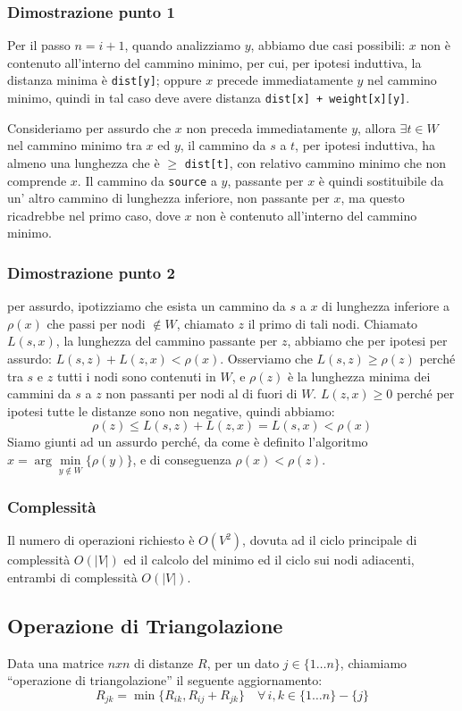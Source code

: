 \documentclass[../template]{subfiles}
\begin{document}
\subsubsection{Dimostrazione punto 1}
Per il passo $n = i+1$, quando analizziamo $y$, abbiamo due casi possibili:
$x$ non è contenuto all'interno del cammino minimo, per cui, per ipotesi induttiva, la distanza minima è \lstinline{dist[y]};
oppure $x$ precede immediatamente $y$ nel cammino minimo, quindi in tal caso deve avere distanza \lstinline{dist[x] + weight[x][y]}.

Consideriamo per assurdo che $x$ non preceda immediatamente $y$, allora $\exists t \in W$ nel cammino minimo tra $x$ ed $y$,
il cammino da $s$ a $t$, per ipotesi induttiva, ha almeno una lunghezza che è $\ge$ \lstinline{dist[t]}, con relativo cammino minimo
che non comprende $x$.
Il cammino da \lstinline{source} a $y$, passante per $x$ è quindi sostituibile da un' altro cammino di lunghezza inferiore, non passante
per $x$, ma questo ricadrebbe nel primo caso, dove $x$ non è contenuto all'interno del cammino minimo.

\subsubsection{Dimostrazione punto 2}
per assurdo, ipotizziamo che esista un cammino da $s$ a $x$ di lunghezza inferiore a $\rho(x)$ che passi per nodi $\notin W$, chiamato $z$
il primo di tali nodi.
Chiamato $L(s, x)$, la lunghezza del cammino passante per $z$, abbiamo che per ipotesi per assurdo: $L(s, z) + L(z, x) < \rho(x)$.
Osserviamo che $L(s, z) \ge \rho(z)$ perché tra $s$ e $z$ tutti i nodi sono contenuti in $W$, e $\rho(z)$ è la lunghezza minima
dei cammini da $s$ a $z$ non passanti per nodi al di fuori di $W$.
$L(z, x) \ge 0$ perché per ipotesi tutte le distanze sono non negative, quindi abbiamo:
\[
    \rho(z) \le L(s, z) + L(z, x) = L(s, x) < \rho(x)
\]
Siamo giunti ad un assurdo perché, da come è definito l'algoritmo $x = \arg\min\limits_{y\notin W}\{\rho(y)\}$, e di
conseguenza $\rho(x) < \rho(z)$.
\subsubsection{Complessità}
Il numero di operazioni richiesto è $O(V^2)$, dovuta ad il ciclo principale di complessità $O(|V|)$ ed il
calcolo del minimo ed il ciclo sui nodi adiacenti, entrambi di complessità $O(|V|)$.

\subsection{Operazione di Triangolazione}
Data una matrice $n x n$ di distanze $R$, per un dato $j \in \{1\ldots n\}$, chiamiamo ``operazione di triangolazione'' il
seguente aggiornamento:
\[
    R_{jk} = \min\big\{R_{ik}, R_{ij} + R_{jk}\big\} \quad \forall\,i, k \in \big\{1\ldots n\big\} - \big\{j\big\}
\]
\end{document}
